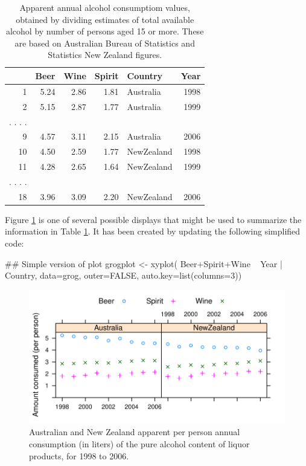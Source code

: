 \begin{table}
\begin{center}
\caption{Apparent annual alcohol consumptiom values, obtained by dividing
    estimates of total available alcohol by number of persons aged 15
    or more. These are based on Australian Bureau of Statistics
    and Statistics New Zealand figures.\label{tab:grog}}
\begin{tabular}{rrrrlr}
  \hline
 & Beer & Wine & Spirit & Country & Year \\
  \hline
1 & 5.24 & 2.86 & 1.81 & Australia & 1998 \\
  2 & 5.15 & 2.87 & 1.77 & Australia & 1999 \\
. . . .\\
  9 & 4.57 & 3.11 & 2.15 & Australia & 2006 \\
  10 & 4.50 & 2.59 & 1.77 & NewZealand & 1998 \\
  11 & 4.28 & 2.65 & 1.64 & NewZealand & 1999 \\
. . . .\\
  18 & 3.96 & 3.09 & 2.20 & NewZealand & 2006 \\
   \hline
\end{tabular}
\end{center}
\end{table}

Figure \ref{fig:allgrog} is one of several possible displays that
might be used to summarize the information in Table \ref{tab:grog}.
It has been created by updating the following simplified code:
\noindent
\begin{Schunk}
\begin{Sinput}
## Simple version of plot
grogplot <- xyplot(
              Beer+Spirit+Wine ~ Year | Country,
              data=grog, outer=FALSE,
              auto.key=list(columns=3))
\end{Sinput}
\end{Schunk}


\begin{figure}
\begin{Schunk}


\centerline{\includegraphics[width=\textwidth]{figs/07-grog-all-1} }

\end{Schunk}
\caption{Australian and New Zealand apparent per person annual
  consumption (in liters) of the pure alcohol content of liquor products, for
  1998 to 2006.\label{fig:allgrog}}
\end{figure}

